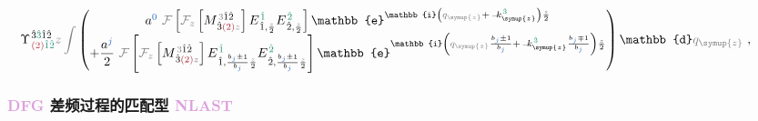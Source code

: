 \begin{subequations}
\begin{align}
		&\hspace*{-1.0em} \Upsilon^{\;\! \hat{3} \textcolor{PineGreen}{\hat{3}} \hat{1} \hat{2} }_{\;\! \textcolor{Maroon}{(2)} \textcolor{PineGreen}{\hat{1} \hat{2}} } \mathcolor{gray}{z} \mathcolor{gray}{\int} \begin{pmatrix} a^{\textcolor{NavyBlue}{0}} ~ \mathcolor{gray}{\mathcal F} \left[ \mathcolor{gray}{\mathcal F_{z}} \left[ {M}^{\;\! \mathcolor{gray}{3} \hat{1} \hat{2} }_{\;\! \hat{3} \textcolor{Maroon}{(2)} \mathcolor{gray}{z} } \right] {E}^{\;\! \textcolor{PineGreen}{\hat{1}}}_{\;\! \hat{1}, \frac{ \mathcolor{gray}{z} }{ 2 }} {E}^{\;\! \textcolor{PineGreen}{\hat{2}}}_{\;\! \hat{2}, \frac{ \mathcolor{gray}{z} }{ 2 }} \right] \mathbb{e}^{\mathbb{i} \left( \mathcolor{gray}{q_{\symup{z}}} + \xint{\begin{smallmatrix} ~ \\ {}^{}_{\mathcolor{gray}{-}} \\ ~ \end{smallmatrix}}{15}{k}_{\symup{z}}^{\;\! \textcolor{PineGreen}{\hat{3}} } \right) \frac{ \mathcolor{gray}{z} }{ 2 }} \\ + \dfrac{a^{\textcolor{NavyBlue}{j}}}{2} ~ \mathcolor{gray}{\mathcal F} \left[ \mathcolor{gray}{\mathcal F_{z}} \left[ {M}^{\;\! \mathcolor{gray}{3} \hat{1} \hat{2} }_{\;\! \hat{3} \textcolor{Maroon}{(2)} \mathcolor{gray}{z} } \right] {E}^{\;\! \textcolor{PineGreen}{\hat{1}}}_{\;\! \hat{1}, \frac{b_{\textcolor{NavyBlue}{j}} \pm 1}{b_{\textcolor{NavyBlue}{j}}} \frac{ \mathcolor{gray}{z} }{ 2 }} {E}^{\;\! \textcolor{PineGreen}{\hat{2}}}_{\;\! \hat{2}, \frac{b_{\textcolor{NavyBlue}{j}} \pm 1}{b_{\textcolor{NavyBlue}{j}}} \frac{ \mathcolor{gray}{z} }{ 2 }} \right] \mathbb{e}^{\mathbb{i} \left( \mathcolor{gray}{q_{\symup{z}}} \frac{b_{\textcolor{NavyBlue}{j}} \pm 1}{b_{\textcolor{NavyBlue}{j}}} + \xint{\begin{smallmatrix} ~ \\ {}^{}_{\mathcolor{gray}{-}} \\ ~ \end{smallmatrix}}{15}{k}_{\symup{z}}^{\;\! \textcolor{PineGreen}{\hat{3}} } \frac{b_{\textcolor{NavyBlue}{j}} \mp 1}{b_{\textcolor{NavyBlue}{j}}} \right) \frac{ \mathcolor{gray}{z} }{ 2 }} \end{pmatrix} \mathbb{d} \mathcolor{gray}{q_{\symup{z}}} \label{eq:up-scalar-G-EE-312-discrete-NLAST_Chord_b}~,
	\end{align}
\end{subequations}

\subsubsection{\textcolor{Plum}{DFG} 差频过程的匹配型 \textcolor{Plum}{NLAST}}\label{sssec:NLAST_chord_DFG}

